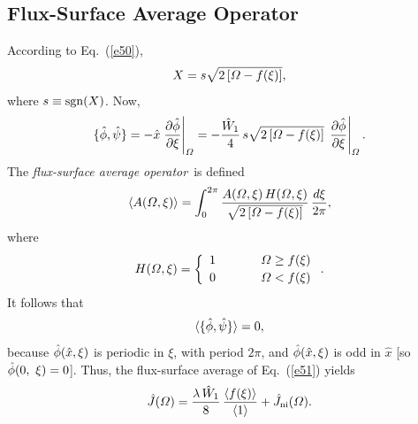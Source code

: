 \documentclass[12pt,prb,aps]{revtex4-1}
\begin{document}
\subsection{Flux-Surface Average Operator}
According to Eq.~(\ref{e50}), 
\begin{equation}
X = s\sqrt{2\left[{\mit\Omega}-f(\xi)\right]},
\end{equation}
where $s\equiv {\rm sgn}(X)$. Now,
\begin{equation}
 \{\skew{3}\hat{\phi},\hat{\psi}\} = -\hat{x}\left.\frac{\partial\hat{\phi}}{\partial\xi}\right|_{\mit\Omega}= -\frac{\hat{W}_1}{4}\,
 s\sqrt{2\left[{\mit\Omega}-f(\xi)\right]}\,\left.\frac{\partial\hat{\phi}}{\partial\xi}\right|_{\mit\Omega}.
 \end{equation}
 The {\em flux-surface average operator}\,\cite{ruth} is defined
 \begin{equation}\label{e54}
 \langle A({\mit\Omega},\xi)\rangle= \int_{0}^{2\pi}\frac{A({\mit\Omega},\xi)\,H({\mit\Omega},\xi)}
 {\sqrt{2\left[{\mit\Omega}-f(\xi)\right]}}\,\frac{d\xi}{2\pi},
 \end{equation}
 where
 \begin{equation}\label{e55}
 H({\mit\Omega},\xi) = \left\{
 \begin{array}{ccc} 1&~~~~~&{\mit\Omega}\geq f(\xi)\\[0.5ex]
 0 &&{\mit\Omega}< f(\xi)\end{array}\right..
 \end{equation}
 It follows that
 \begin{equation}
 \langle \{\skew{3}\hat{\phi},\hat{\psi}\}\rangle = 0,
 \end{equation}
 because $\skew{3}\hat{\phi}(\hat{x},\xi)$ is periodic in $\xi$, with period $2\pi$, and $\skew{3}\hat{\phi}(\hat{x},\xi)$
 is odd in $\hat{x}$ [so $\skew{3}\hat{\phi}(0,\
 \xi)=0$]. Thus, the flux-surface average of Eq.~(\ref{e51}) yields
 \begin{equation}\label{e57}
 \hat{J}({\mit\Omega}) = \frac{\lambda\,\hat{W}_1}{8}\,\frac{\langle f(\xi)\rangle}{\langle 1\rangle} + \hat{J}_{\rm ni}({\mit\Omega}).
 \end{equation}
\end{document}
